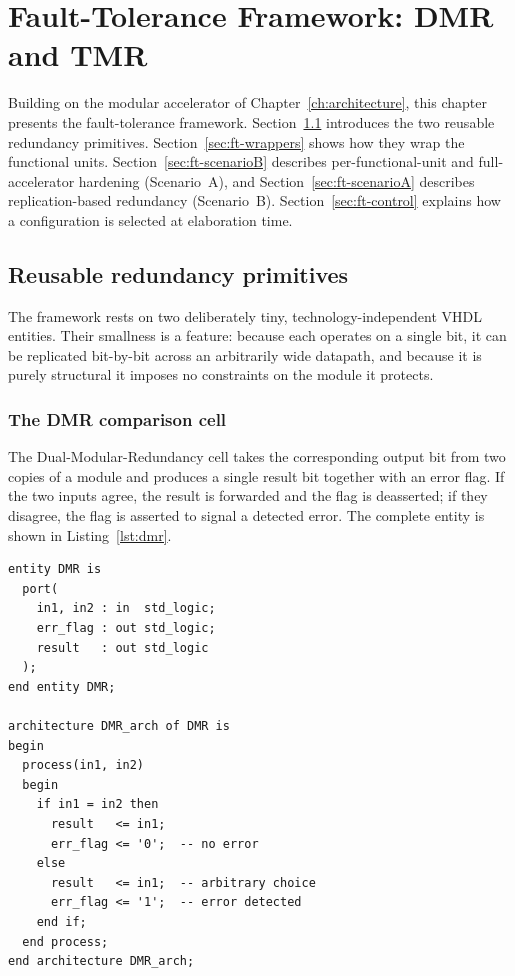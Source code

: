 \chapter{Fault-Tolerance Framework: DMR and TMR}
\label{ch:framework}

Building on the modular accelerator of Chapter~\ref{ch:architecture}, this
chapter presents the fault-tolerance framework. Section~\ref{sec:ft-primitives}
introduces the two reusable redundancy primitives. Section~\ref{sec:ft-wrappers}
shows how they wrap the functional units. Section~\ref{sec:ft-scenarioB}
describes per-functional-unit and full-accelerator hardening (Scenario~A), and
Section~\ref{sec:ft-scenarioA} describes replication-based redundancy
(Scenario~B). Section~\ref{sec:ft-control} explains how a configuration is
selected at elaboration time.

\section{Reusable redundancy primitives}
\label{sec:ft-primitives}

The framework rests on two deliberately tiny, technology-independent VHDL
entities. Their smallness is a feature: because each operates on a single bit,
it can be replicated bit-by-bit across an arbitrarily wide datapath, and because
it is purely structural it imposes no constraints on the module it protects.

\subsection{The DMR comparison cell}

The Dual-Modular-Redundancy cell takes the corresponding output bit from two
copies of a module and produces a single result bit together with an error flag.
If the two inputs agree, the result is forwarded and the flag is deasserted; if
they disagree, the flag is asserted to signal a detected error. The complete
entity is shown in Listing~\ref{lst:dmr}.

\begin{lstlisting}[language=myvhdl, caption={The single-bit DMR comparison cell.}, label={lst:dmr}]
entity DMR is
  port(
    in1, in2 : in  std_logic;
    err_flag : out std_logic;
    result   : out std_logic
  );
end entity DMR;

architecture DMR_arch of DMR is
begin
  process(in1, in2)
  begin
    if in1 = in2 then
      result   <= in1;
      err_flag <= '0';  -- no error
    else
      result   <= in1;  -- arbitrary choice
      err_flag <= '1';  -- error detected
    end if;
  end process;
end architecture DMR_arch;
\end{lstlisting}

